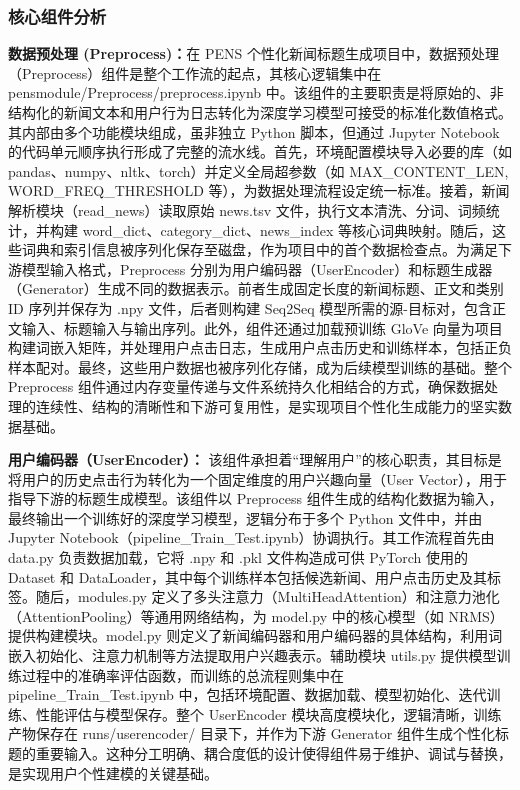 \documentclass[10pt,a4paper]{article}
\begin{document}
\subsubsection{核心组件分析}
\textbf{数据预处理 (Preprocess)：}在 PENS 个性化新闻标题生成项目中，数据预处理（Preprocess）组件是整个工作流的起点，其核心逻辑集中在 pensmodule/Preprocess/preprocess.ipynb 中。该组件的主要职责是将原始的、非结构化的新闻文本和用户行为日志转化为深度学习模型可接受的标准化数值格式。其内部由多个功能模块组成，虽非独立 Python 脚本，但通过 Jupyter Notebook 的代码单元顺序执行形成了完整的流水线。首先，环境配置模块导入必要的库（如 pandas、numpy、nltk、torch）并定义全局超参数（如 MAX\_CONTENT\_LEN, WORD\_FREQ\_THRESHOLD 等），为数据处理流程设定统一标准。接着，新闻解析模块（read\_news）读取原始 news.tsv 文件，执行文本清洗、分词、词频统计，并构建 word\_dict、category\_dict、news\_index 等核心词典映射。随后，这些词典和索引信息被序列化保存至磁盘，作为项目中的首个数据检查点。为满足下游模型输入格式，Preprocess 分别为用户编码器（UserEncoder）和标题生成器（Generator）生成不同的数据表示。前者生成固定长度的新闻标题、正文和类别 ID 序列并保存为 .npy 文件，后者则构建 Seq2Seq 模型所需的源-目标对，包含正文输入、标题输入与输出序列。此外，组件还通过加载预训练 GloVe 向量为项目构建词嵌入矩阵，并处理用户点击日志，生成用户点击历史和训练样本，包括正负样本配对。最终，这些用户数据也被序列化存储，成为后续模型训练的基础。整个 Preprocess 组件通过内存变量传递与文件系统持久化相结合的方式，确保数据处理的连续性、结构的清晰性和下游可复用性，是实现项目个性化生成能力的坚实数据基础。

\textbf{用户编码器（UserEncoder）：}
该组件承担着“理解用户”的核心职责，其目标是将用户的历史点击行为转化为一个固定维度的用户兴趣向量（User Vector），用于指导下游的标题生成模型。该组件以 Preprocess 组件生成的结构化数据为输入，最终输出一个训练好的深度学习模型，逻辑分布于多个 Python 文件中，并由 Jupyter Notebook（pipeline\_Train\_Test.ipynb）协调执行。其工作流程首先由 data.py 负责数据加载，它将 .npy 和 .pkl 文件构造成可供 PyTorch 使用的 Dataset 和 DataLoader，其中每个训练样本包括候选新闻、用户点击历史及其标签。随后，modules.py 定义了多头注意力（MultiHeadAttention）和注意力池化（AttentionPooling）等通用网络结构，为 model.py 中的核心模型（如 NRMS）提供构建模块。model.py 则定义了新闻编码器和用户编码器的具体结构，利用词嵌入初始化、注意力机制等方法提取用户兴趣表示。辅助模块 utils.py 提供模型训练过程中的准确率评估函数，而训练的总流程则集中在 pipeline\_Train\_Test.ipynb 中，包括环境配置、数据加载、模型初始化、迭代训练、性能评估与模型保存。整个 UserEncoder 模块高度模块化，逻辑清晰，训练产物保存在 runs/userencoder/ 目录下，并作为下游 Generator 组件生成个性化标题的重要输入。这种分工明确、耦合度低的设计使得组件易于维护、调试与替换，是实现用户个性建模的关键基础。
\end{document}
